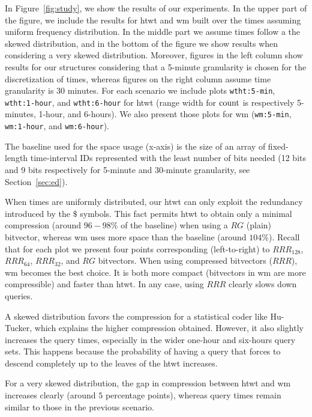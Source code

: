 	In Figure~\ref{fig:study}, we show the results of our experiments. In the upper part of the figure, we 
	include the results for \gls{htwt} and \gls{wm} built over the times assuming uniform frequency distribution.
	In the middle part we assume times follow a the skewed distribution, and in the bottom of the figure we show
	results when considering a very skewed distribution. Moreover, figures in the left column show results
	for our structures considering that a 5-minute granularity is chosen for the discretization of times, whereas
	figures on the right column assume time granularity is 30 minutes. For each scenario we include plots
	\texttt{wtht:5-min}, \texttt{wtht:1-hour}, and \texttt{wtht:6-hour} for \gls{htwt} (range width for $\operatorname{count}$ is respectively
	5-minutes, 1-hour, and 6-hours). We also present those plots for \gls{wm} (\texttt{wm:5-min}, \texttt{wm:1-hour}, and \texttt{wm:6-hour}).

	The baseline used for the space usage (x-axis) is the size of an array of
	fixed-length time-interval IDs represented with the least number of bits needed (12 bits and 9 bits
	respectively for 5-minute and 30-minute granularity, see Section~\ref{sec:ed}).
	\medskip


	When times are uniformly distributed, our \gls{htwt} can only exploit the redundancy introduced by
	the $\$$ symbols. This fact permits \gls{htwt} to obtain only a minimal compression (around $96-98\%$ of the baseline)
	when using a $RG$ (plain) bitvector, whereas \gls{wm} uses more space than the baseline (around $104\%$).
	Recall that for each plot we present four points corresponding (left-to-right) 
	to $RRR_{128}$, $RRR_{64}$, $RRR_{32}$, and $RG$ bitvectors.
	When using compressed  bitvectors ($RRR$), \gls{wm} becomes the best choice. It is both more compact 
	(bitvectors in \gls{wm} are more compressible) and faster than \gls{htwt}. 
	In any case, using $RRR$ clearly slows down queries.

	A skewed distribution favors the compression for a statistical coder like Hu-Tucker,
	which explains the higher compression obtained. However,
	it also slightly increases the query times, especially in the wider
	one-hour and six-hours query sets. This happens because the probability of having a query 
	that forces to descend completely up to the leaves of the \gls{htwt} increases.

	For a very skewed distribution, the gap in compression between \gls{htwt} and \gls{wm} increases clearly (around 
	$5$ percentage points), whereas query times remain similar to those in the previous scenario.


